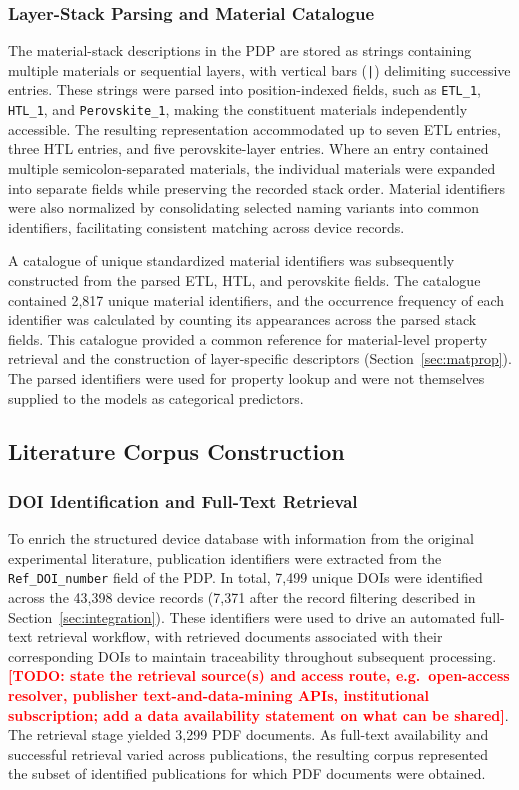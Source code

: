 \documentclass[3p]{elsarticle}
\newcommand{\authortodo}[1]{\textcolor{red}{\textbf{[TODO: #1]}}}
\begin{document}
\subsubsection{Layer-Stack Parsing and Material Catalogue}

The material-stack descriptions in the PDP are stored as strings containing multiple materials or sequential layers, with vertical bars (\texttt{|}) delimiting successive entries. These strings were parsed into position-indexed fields, such as \texttt{ETL\_1}, \texttt{HTL\_1}, and \texttt{Perovskite\_1}, making the constituent materials independently accessible. The resulting representation accommodated up to seven ETL entries, three HTL entries, and five perovskite-layer entries. Where an entry contained multiple semicolon-separated materials, the individual materials were expanded into separate fields while preserving the recorded stack order. Material identifiers were also normalized by consolidating selected naming variants into common identifiers, facilitating consistent matching across device records.

A catalogue of unique standardized material identifiers was subsequently constructed from the parsed ETL, HTL, and perovskite fields. The catalogue contained 2,817 unique material identifiers, and the occurrence frequency of each identifier was calculated by counting its appearances across the parsed stack fields. This catalogue provided a common reference for material-level property retrieval and the construction of layer-specific descriptors (Section~\ref{sec:matprop}). The parsed identifiers were used for property lookup and were not themselves supplied to the models as categorical predictors.

\subsection{Literature Corpus Construction}

\subsubsection{DOI Identification and Full-Text Retrieval}

To enrich the structured device database with information from the original experimental literature, publication identifiers were extracted from the \texttt{Ref\_DOI\_number} field of the PDP. In total, 7,499 unique DOIs were identified across the 43,398 device records (7,371 after the record filtering described in Section~\ref{sec:integration}). These identifiers were used to drive an automated full-text retrieval workflow, with retrieved documents associated with their corresponding DOIs to maintain traceability throughout subsequent processing. \authortodo{state the retrieval source(s) and access route, e.g.\ open-access resolver, publisher text-and-data-mining APIs, institutional subscription; add a data availability statement on what can be shared}. The retrieval stage yielded 3,299 PDF documents. As full-text availability and successful retrieval varied across publications, the resulting corpus represented the subset of identified publications for which PDF documents were obtained.
\end{document}
